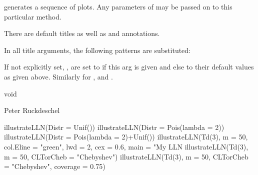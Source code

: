 \begin{Details}\relax
{} generates a sequence of plots.
Any parameters of  may be passed on to this particular
 method. 

There are default  titles as well as  and 
annotations.

In all title arguments, the following patterns are substituted:

If not explicitly set, ,  are set 
to  if this arg is given and else to their default values as given
above. Similarly for ,  and .
\end{Details}
\begin{Value}
void
\end{Value}
\begin{Author}\relax
Peter Ruckdeschel 
\end{Author}
\begin{Examples}
\begin{ExampleCode}
illustrateLLN(Distr = Unif())
illustrateLLN(Distr = Pois(lambda = 2))
illustrateLLN(Distr = Pois(lambda = 2)+Unif())
illustrateLLN(Td(3), m = 50, col.Eline = "green", lwd = 2, cex = 0.6, main = 
 "My LLN %
illustrateLLN(Td(3), m = 50, CLTorCheb = "Chebyshev") 
illustrateLLN(Td(3), m = 50, CLTorCheb = "Chebyshev", coverage = 0.75) 
\end{ExampleCode}
\end{Examples}

